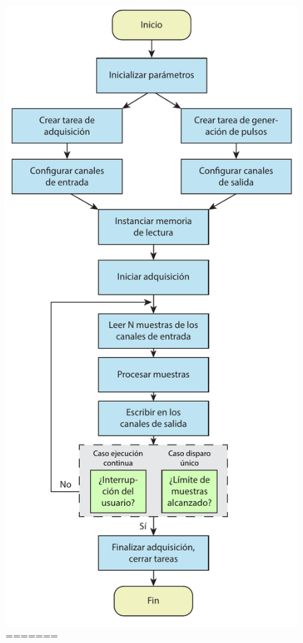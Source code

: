 \documentclass[a4paper,11pt]{article}
\begin{document}
	\begin{figure}[!ht] 
        \centering
        \includegraphics[height=.9\textheight]{flujo_software.pdf}
=======
	\begin{figure}[h!] 

\end{figure}
\end{figure}
\end{document}
